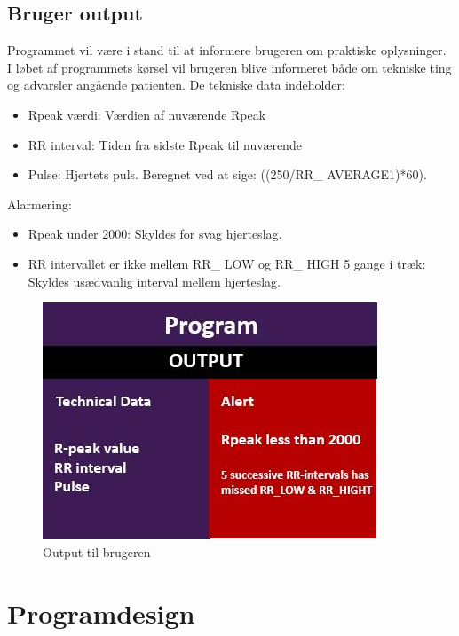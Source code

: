 \documentclass[a4paper,12pt]{article}
\begin{document}
\subsection{Bruger output}
Programmet vil være i stand til at informere brugeren om praktiske oplysninger. I løbet af programmets kørsel vil brugeren blive informeret både om tekniske ting og advarsler angående patienten.
De tekniske data indeholder:
\begin{itemize}
\item Rpeak værdi: Værdien af nuværende Rpeak
\item RR interval: Tiden fra sidste Rpeak til nuværende
\item Pulse: Hjertets puls. Beregnet ved at sige:  ((250/RR\_ AVERAGE1)*60).
\end{itemize}
Alarmering:
\begin{itemize}
\item Rpeak under 2000: Skyldes for svag hjerteslag.
\item RR intervallet er ikke mellem RR\_ LOW og RR\_ HIGH 5 gange i træk: Skyldes usædvanlig interval mellem hjerteslag.
\end{itemize}	
\begin{figure}[htp]
\centering
\includegraphics[scale=0.7]{output.jpg}
\caption{Output til brugeren}
\label{what up}
\end{figure}
\section{Programdesign}
\end{document}
